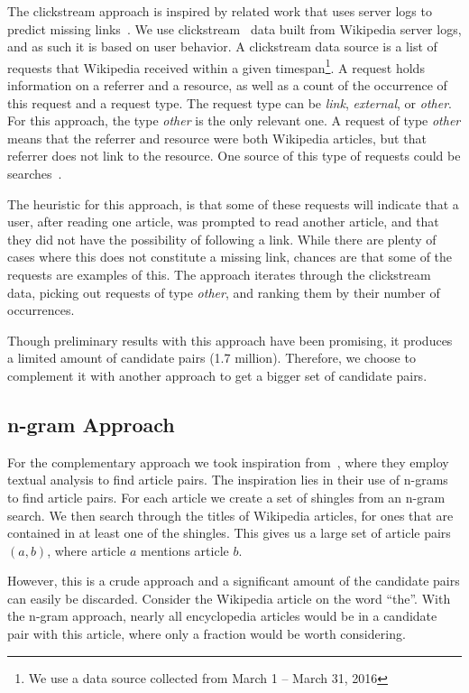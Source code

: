 The clickstream approach is inspired by related work that uses server logs to predict missing links~\cite{hyperlink-structure-using-logs}. We use clickstream~\cite{wiki-clickstream} data built from Wikipedia server logs, and as such it is based on user behavior. A clickstream data source is a list of requests that Wikipedia received within a given timespan\footnote{We use a data source collected from March 1 -- March 31, 2016}. A request holds information on a referrer and a resource, as well as a count of the occurrence of this request and a request type. The request type can be \emph{link}, \emph{external}, or \emph{other}. For this approach, the type \emph{other} is the only relevant one. A request of type \emph{other} means that the referrer and resource were both Wikipedia articles, but that referrer does not link to the resource. One source of this type of requests could be searches~\cite{wiki-clickstream}.

The heuristic for this approach, is that some of these requests will indicate that a user, after reading one article, was prompted to read another article, and that they did not have the possibility of following a link. While there are plenty of cases where this does not constitute a missing link, chances are that some of the requests are examples of this. The approach iterates through the clickstream data, picking out requests of type \emph{other}, and ranking them by their number of occurrences.

Though preliminary results with this approach have been promising, it produces a limited amount of candidate pairs (1.7 million). Therefore, we choose to complement it with another approach to get a bigger set of candidate pairs.

\subsection{n-gram Approach}

For the complementary approach we took inspiration from~\cite{milne2008learning}, where they employ textual analysis to find article pairs. The inspiration lies in their use of n-grams to find article pairs. For each article we create a set of shingles from an n-gram search. We then search through the titles of Wikipedia articles, for ones that are contained in at least one of the shingles. This gives us a large set of article pairs $(a,b)$, where article $a$ mentions article $b$.

However, this is a crude approach and a significant amount of the candidate pairs can easily be discarded. Consider the Wikipedia article on the word \enquote{the}. With the n-gram approach, nearly all encyclopedia articles would be in a candidate pair with this article, where only a fraction would be worth considering.

